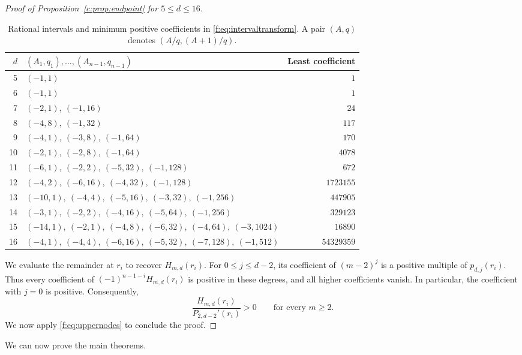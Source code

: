 \documentclass[11pt]{article}
\numberwithin{equation}{section}
\theoremstyle{remark}\newtheorem{remark}[theorem]{Remark}
\begin{document}
\begin{proof}[Proof of Proposition~\ref{c:prop:endpoint} for $5\le d\le16$]
\begin{table}[htbp]
\centering
\small
\setlength{\tabcolsep}{5pt}
\caption{Rational intervals and minimum positive coefficients in
\eqref{f:eq:intervaltransform}. A pair $(A,q)$ denotes $(A/q,(A+1)/q)$.}
\label{tab:intervals}
\begin{tabular}{@{}r l r@{}}
\toprule
$d$ & $(A_1,q_1),\ldots,(A_{n-1},q_{n-1})$ & Least coefficient\\
\midrule
5 & $(-1,1)$ & $1$\\
6 & $(-1,1)$ & $1$\\
7 & $(-2,1),\ (-1,16)$ & $24$\\
8 & $(-4,8),\ (-1,32)$ & $117$\\
9 & $(-4,1),\ (-3,8),\ (-1,64)$ & $170$\\
10 & $(-2,1),\ (-2,8),\ (-1,64)$ & $4078$\\
11 & $(-6,1),\ (-2,2),\ (-5,32),\ (-1,128)$ & $672$\\
12 & $(-4,2),\ (-6,16),\ (-4,32),\ (-1,128)$ & $1723155$\\
13 & $(-10,1),\ (-4,4),\ (-5,16),\ (-3,32),\ (-1,256)$ & $447905$\\
14 & $(-3,1),\ (-2,2),\ (-4,16),\ (-5,64),\ (-1,256)$ & $329123$\\
15 & $(-14,1),\ (-2,1),\ (-4,8),\ (-6,32),\ (-4,64),\ (-3,1024)$ & $16890$\\
16 & $(-4,1),\ (-4,4),\ (-6,16),\ (-5,32),\ (-7,128),\ (-1,512)$ & $54329359$\\
\bottomrule
\end{tabular}
\end{table}

We evaluate the remainder at $r_i$ to recover $H_{m,d}(r_i)$.
For $0\le j\le d-2$, its coefficient of $(m-2)^j$ is a positive
multiple of $p_{d,j}(r_i)$. Thus every coefficient of
$(-1)^{n-1-i}H_{m,d}(r_i)$ is positive in these degrees, and all
higher coefficients vanish. In particular, the coefficient with $j=0$ is positive.
Consequently,
\[
 \frac{H_{m,d}(r_i)}{P_{2,d-2}'(r_i)}>0
 \qquad\text{for every }m\ge2.
\]
We now apply \eqref{f:eq:uppernodes} to conclude the proof.
\end{proof}

\FloatBarrier
We can now prove the main theorems.
\end{document}
